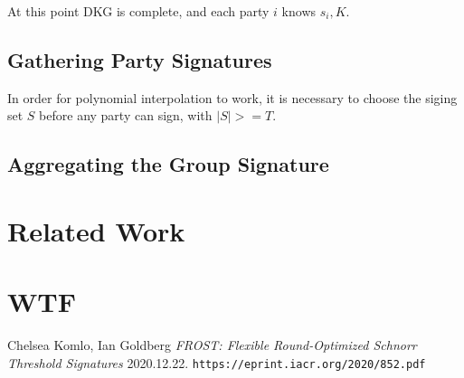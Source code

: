 \documentclass{article}
\begin{document}
At this point DKG is complete, and each party $i$ knows $s_i, K$.

\subsection{
  Gathering Party Signatures
}

In order for polynomial interpolation to work, it is necessary to choose the siging set $S$ before any party can sign, with $|S| >= T$.

\subsection{
  Aggregating the Group Signature
}


\newpage
\onecolumn
\section{
  Related Work
}


\newpage
\onecolumn
\section{
  WTF
}


\newpage
\onecolumn
\begin{thebibliography}{1}

  Chelsea Komlo, Ian Goldberg
  \emph{FROST: Flexible Round-Optimized Schnorr Threshold Signatures} 2020.12.22.
  \texttt{https://eprint.iacr.org/2020/852.pdf}

\end{thebibliography}
\end{document}
